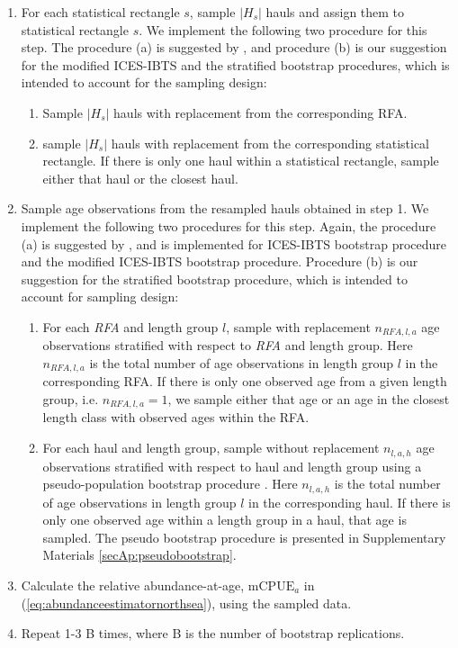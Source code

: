 \documentclass[a4paper 12pt]{article}
\numberwithin{equation}{section}
\begin{document}
\begin{enumerate}
\item For each statistical rectangle $s$, sample $|H_s|$ hauls and assign them to statistical rectangle $s$. We implement the following two procedure for this step. The procedure (a) is suggested by \citep{ICES2006Report}, and procedure (b) is our suggestion for the modified ICES-IBTS and the stratified  bootstrap procedures, which is intended to account for the sampling design: 
\begin{enumerate}
\item Sample $|H_s|$ hauls with replacement from the corresponding RFA.
\item sample $|H_s|$ hauls with replacement from the corresponding statistical rectangle. If there is only one haul within a statistical rectangle, sample either that haul or the closest haul.
\end{enumerate}
\item Sample age observations from the resampled hauls obtained in step 1. We implement the following two procedures for this step. Again, the procedure (a) is suggested by \citep{ICES2006Report}, and is implemented for ICES-IBTS bootstrap procedure and the modified ICES-IBTS bootstrap procedure. Procedure (b) is our suggestion for the stratified bootstrap procedure, which is intended to account for sampling design: 
\begin{enumerate}
\item For each \textit{RFA} and length group $l$, sample with replacement $n_{RFA,l,a}$ age observations stratified with respect to \textit{RFA} and length group. Here $n_{RFA,l,a}$ is the total number of age observations in length group $l$ in the corresponding RFA. If there is only one observed age from a given length group, i.e. $n_{RFA,l,a} = 1$, we sample either that age or an age in the closest length class with observed ages within the RFA.
\item For each haul and length group, sample without replacement  $n_{l,a,h}$ age observations stratified with respect to haul and length group using a pseudo-population bootstrap procedure \citep{mashreghi2016survey}. Here $n_{l,a,h}$ is the total number of age observations in length group $l$ in the corresponding haul. If there is only one observed age within a length group in a haul, that age is sampled. The pseudo bootstrap procedure is presented in Supplementary Materials \ref{secAp:pseudobootstrap}. 

\end{enumerate}
\item Calculate the relative abundance-at-age, $\text{mCPUE}_a$ in (\ref{eq:abundanceestimatornorthsea}), using the sampled data.
\item Repeat 1-3 B times, where B is the number of bootstrap replications.
\end{enumerate}
\end{document}
